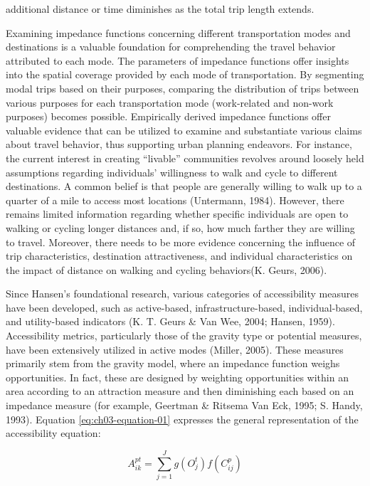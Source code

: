 \documentclass[
11pt, %
oneside, %
english, %
singlespacing, %
]{macthesis} %
\begin{document}
additional distance or time diminishes as the total trip length extends.

Examining impedance functions concerning different transportation modes and destinations is a valuable foundation for comprehending the travel behavior attributed to each mode. The parameters of impedance functions offer insights into the spatial coverage provided by each mode of transportation. By segmenting modal trips based on their purposes, comparing the distribution of trips between various purposes for each transportation mode (work-related and non-work purposes) becomes possible. Empirically derived impedance functions offer valuable evidence that can be utilized to examine and substantiate various claims about travel behavior, thus supporting urban planning endeavors. For instance, the current interest in creating ``livable'' communities revolves around loosely held assumptions regarding individuals' willingness to walk and cycle to different destinations. A common belief is that people are generally willing to walk up to a quarter of a mile to access most locations (Untermann, 1984). However, there remains limited information regarding whether specific individuals are open to walking or cycling longer distances and, if so, how much farther they are willing to travel. Moreover, there needs to be more evidence concerning the influence of trip characteristics, destination attractiveness, and individual characteristics on the impact of distance on walking and cycling behaviors(K. Geurs, 2006).

Since Hansen's foundational research, various categories of accessibility measures have been developed, such as active-based, infrastructure-based, individual-based, and utility-based indicators (K. T. Geurs \& Van Wee, 2004; Hansen, 1959). Accessibility metrics, particularly those of the gravity type or potential measures, have been extensively utilized in active modes (Miller, 2005). These measures primarily stem from the gravity model, where an impedance function weighs opportunities. In fact, these are designed by weighting opportunities within an area according to an attraction measure and then diminishing each based on an impedance measure (for example, Geertman \& Ritsema Van Eck, 1995; S. Handy, 1993). Equation \ref{eq:ch03-equation-01} expresses the general representation of the accessibility equation:

\begin{equation}
A_{ik}^{pt} = \sum_{j=1}^J g(O_j^t) f(C_{ij}^p)
\label{eq:ch03-equation-01}
\end{equation}
\end{document}
